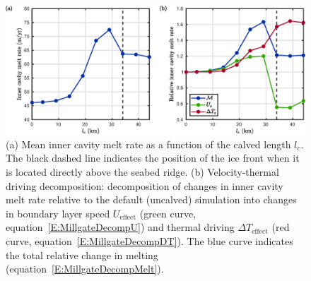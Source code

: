 \documentclass[draft]{agujournal2019}
\begin{document}
\begin{figure}
    \centering
    \includegraphics[width = \textwidth]{../make_figures/plots/figure4.eps}
    \caption{(a) Mean inner cavity melt rate as a function of the calved length $l_c$. The black dashed line indicates the position of the ice front when it is located directly above the seabed ridge. (b) Velocity-thermal driving decomposition: decomposition of changes in inner cavity melt rate relative to the default (uncalved) simulation into changes in boundary layer speed $U_\text{effect}$ (green curve, equation~\eqref{E:MillgateDecompU}) and thermal driving $\Delta T_{\text{effect}}$ (red curve, equation~\eqref{E:MillgateDecompDT}). The blue curve indicates the total relative change in melting (equation~\eqref{E:MillgateDecompMelt}).}
    \label{fig:figure4}
\end{figure}
\end{document}
